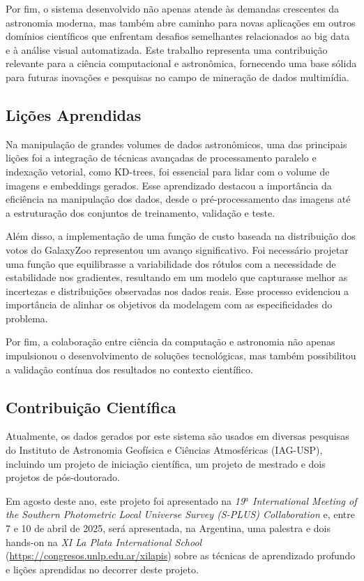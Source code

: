 Por fim, o sistema desenvolvido não apenas atende às demandas crescentes da astronomia moderna, mas também abre caminho para novas aplicações em outros domínios científicos que enfrentam desafios semelhantes relacionados ao big data e à análise visual automatizada. Este trabalho representa uma contribuição relevante para a ciência computacional e astronômica, fornecendo uma base sólida para futuras inovações e pesquisas no campo de mineração de dados multimídia.




\subsection{Lições Aprendidas}
Na manipulação de grandes volumes de dados astronômicos, uma das principais lições foi a  integração de técnicas avançadas de processamento paralelo e indexação vetorial, como KD-trees, foi essencial para lidar com o volume de imagens e embeddings gerados. Esse aprendizado destacou a importância da eficiência na manipulação dos dados, desde o pré-processamento das imagens até a estruturação dos conjuntos de treinamento, validação e teste.

Além disso, a implementação de uma função de custo baseada na distribuição dos votos do GalaxyZoo representou um avanço significativo. Foi necessário projetar uma função que equilibrasse a variabilidade dos rótulos com a necessidade de estabilidade nos gradientes, resultando em um modelo que capturasse melhor as incertezas e distribuições observadas nos dados reais. Esse processo evidenciou a importância de alinhar os objetivos da modelagem com as especificidades do problema.

Por fim, a colaboração entre ciência da computação e astronomia não apenas impulsionou o desenvolvimento de soluções tecnológicas, mas também possibilitou a validação contínua dos resultados no contexto científico.



\subsection{Contribuição Científica}
Atualmente, os dados gerados por este sistema são usados em diversas pesquisas do Instituto de Astronomia Geofísica e Ciências Atmosféricas (IAG-USP), incluindo um projeto de iniciação científica, um projeto de mestrado e dois projetos de pós-doutorado.

Em agosto deste ano, este projeto foi apresentado na \emph{19$^a$ International Meeting of the Southern Photometric Local Universe Survey (S-PLUS) Collaboration} e, entre 7 e 10 de abril de 2025, será apresentada, na Argentina, uma palestra e dois hands-on na \emph{XI La Plata International School} (\url{https://congresos.unlp.edu.ar/xilapis}) sobre as técnicas de aprendizado profundo e lições aprendidas no decorrer deste projeto.




